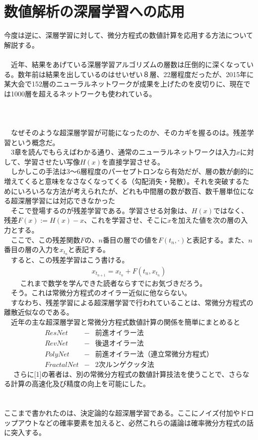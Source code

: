 \documentclass{jsarticle}
\begin{document}
\section{数値解析の深層学習への応用}
今度は逆に、深層学習に対して、微分方程式の数値計算を応用する方法について解説する。\\
　\\ 
　近年、結果をあげている深層学習アルゴリズムの層数は圧倒的に深くなっている。数年前は結果を出しているのはせいぜい８層、22層程度だったが、2015年に某大会で152層のニューラルネットワークが成果を上げたのを皮切りに、現在では1000層を超えるネットワークも使われている。\\
 　\\
 　\\
\scalebox{1.1}{1.残差学習}\\
　なぜそのような超深層学習が可能になったのか、そのカギを握るのは。残差学習という概念だ。\\
　3章を読んでもらえばわかる通り、通常のニューラルネットワークは入力$x$に対して、学習させたい写像$H(x)$を直接学習させる。\\
　しかしこの手法は3～6層程度のパーセプトロンなら有効だが、層の数が劇的に増えてくると意味をなさなくなってくる（勾配消失・発散）。それを突破するためにいろいろな方法が考えられたが、どれも中間層の数が数百、数千層単位になる超深層学習には対応できなかった\\
　そこで登場するのが残差学習である。学習させる対象は、$H(x)$ではなく、残差$F(x):=H(x)-x$、これを学習させ、そこに$x$を加えた値を次の層の入力とする。\\
　ここで、この残差関数$F$の、$n$番目の層での値を$F(t_n,\cdot)$と表記する。また、$n$番目の層の入力を$x_{t_n}$と表記する。\\
　すると、この残差学習はこう書ける。
\begin{eqnarray}
x_{t_{n+1}}=x_{t_n}+F(t_n,x_{t_n})
\end{eqnarray}　
　これまで数学を学んできた読者ならすでにお気づきだろう。\\
　そう。これは常微分方程式のオイラー近似に他ならない。\\
　すなわち、残差学習による超深層学習で行われていることは、常微分方程式の離散近似なのである。\\
　近年の主な超深層学習と常微分方程式数値計算の関係を簡単にまとめると
\begin{eqnarray}
ResNet &-& 前進オイラー法\\
RevNet &-& 後退オイラー法\\
PolyNet &-& 前進オイラー法（連立常微分方程式）\\
FractalNet &-& 2次ルンゲクッタ法
\end{eqnarray}　
さらに[1]の著者は、別の常微分方程式の数値計算技法を使うことで、さらなる計算の高速化及び精度の向上を可能にした。\\
　\\
\scalebox{1.1}{2.確率的超深層学習と確率微分方程式}\\
ここまで書かれたのは、決定論的な超深層学習である。ここにノイズ付加やドロップアウトなどの確率要素を加えると、必然これらの議論は確率微分方程式の話に突入する。
\end{document}
